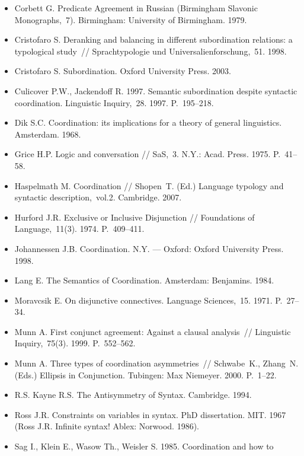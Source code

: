 \begin{itemize}
  \item
        Corbett G. Predicate Agreement in Russian (Birmingham Slavonic
        Monographs,~7). Birmingham: University of Birmingham. 1979.
  \item
        Cristofaro S. Deranking and balancing in different subordination
        relations: a typological study~// Sprachtypologie und
        Universalienforschung,~51. 1998.
  \item
        Cristofaro S. Subordination. Oxford University Press. 2003.
  \item
        Culicover P.W., Jackendoff R. 1997. Semantic subordination despite
        syntactic coordination. Linguistic Inquiry,~28. 1997. P.~195--218.
  \item
        Dik S.C. Coordination: its implications for a theory of general
        linguistics. Amsterdam. 1968.
  \item
        Grice H.P. Logic and conversation // SaS,~3. N.Y.: Acad. Press. 1975.
        P.~41--58.
  \item
        Haspelmath M. Coordination // Shopen~T. (Ed.) Language typology and
        syntactic description,~vol.2. Cambridge. 2007.
  \item
        Hurford J.R. Exclusive or Inclusive Disjunction // Foundations of
        Language,~11(3). 1974. P.~409--411.
  \item
        Johannessen J.B. Coordination. N.Y. --- Oxford: Oxford University
        Press. 1998.
  \item
        Lang E. The Semantics of Coordination. Amsterdam: Benjamins. 1984.
  \item
        Moravcsik E. On disjunctive connectives. Language Sciences,~15. 1971.
        P.~27--34.
  \item
        Munn A. First conjunct agreement: Against a clausal analysis~//
        Linguistic Inquiry,~75(3). 1999. P.~552--562.
  \item
        Munn A. Three types of coordination asymmetries~// Schwabe~K.,
        Zhang~N. (Eds.) Ellipsis in Conjunction. Tubingen: Max Niemeyer. 2000.
        P.~1--22.
  \item
        R.S. Kayne R.S. The Antisymmetry of Syntax. Cambridge. 1994.
  \item
        Ross J.R. Constraints on variables in syntax. PhD dissertation. MIT.
        1967 (Ross J.R. Infinite syntax! Ablex: Norwood. 1986).
  \item
        Sag I., Klein E., Wasow Th., Weisler S. 1985. Coordination and how to

\end{itemize}
